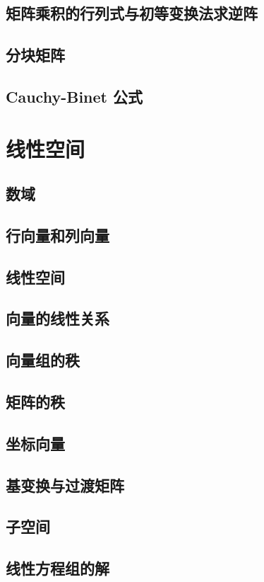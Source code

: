 \documentclass[a4paper, 11pt]{ctexbook}
\begin{document}
        \section{矩阵乘积的行列式与初等变换法求逆阵}
        \section{分块矩阵}
        \section{Cauchy-Binet 公式}
    \chapter{线性空间}
        \section{数域}
        \section{行向量和列向量}
        \section{线性空间}
        \section{向量的线性关系}
        \section{向量组的秩}
        \section{矩阵的秩}
        \section{坐标向量}
        \section{基变换与过渡矩阵}
        \section{子空间}
        \section{线性方程组的解}
\end{document}
